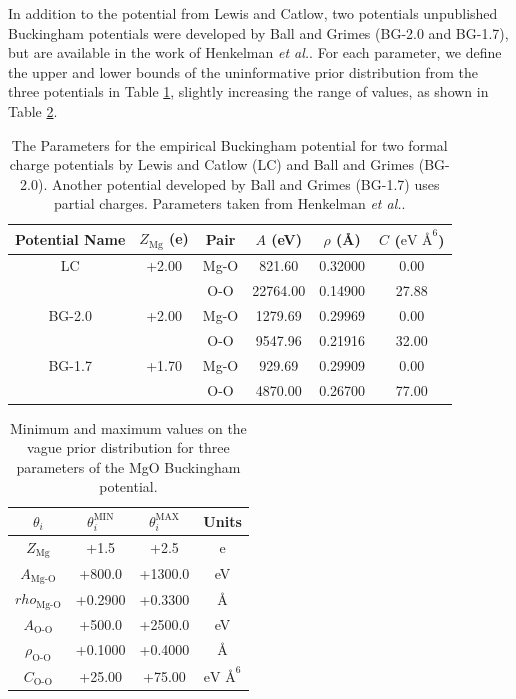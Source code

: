 In addition to the potential from Lewis and Catlow, two potentials unpublished Buckingham potentials were developed by Ball and Grimes (BG-2.0 and BG-1.7), but are available in the work of Henkelman \emph{et al.}\cite{henkelman2005_buckingham_MgO}.  For each parameter, we define the upper and lower bounds of the uninformative prior distribution from the three potentials in Table \ref{tlb:MgO_prior_potentials}, slightly increasing the range of values, as shown in Table \ref{tbl:MgO_inital_distribution}.

\begin{table}[ht]
	\caption{The Parameters for the empirical Buckingham potential for two formal charge potentials by Lewis and Catlow (LC)\cite{lewis1985_buckingham} and Ball and Grimes (BG-2.0). Another potential developed by Ball and Grimes (BG-1.7) uses partial charges. Parameters taken from Henkelman \emph{et al.}\cite{henkelman2005_buckingham_MgO}.}
	\label{tlb:MgO_prior_potentials}
	\centering
	\begin{tabular}{cccccc}
		\hline
		{Potential Name} & {$Z_{\text{Mg}}$ (e)} & Pair	 & $A$ (eV) & $\rho$ (\AA)	& $C$ ($\text{eV \AA}^6$) \\
		\hline
		LC	&    +2.00   &  Mg-O   &	 821.60  &   0.32000  &  0.00 \\
			  &            &   O-O	 & 22764.00	 &   0.14900  & 27.88 \\
		BG-2.0 & +2.00   &	Mg-O	 &  1279.69  &   0.29969  &  0.00 \\
		       &         & 	 O-O	 &  9547.96	 &   0.21916	& 32.00 \\
		BG-1.7 &  +1.70  &  Mg-O   &   929.69  &   0.29909  &	 0.00 \\
           &         &   O-O   &  4870.00	 &   0.26700  &	77.00 \\
		\hline
	\end{tabular}
\end{table}

\begin{table}[ht]
	\caption{Minimum and maximum values on the vague prior distribution for three parameters of the MgO Buckingham potential.}
	\label{tbl:MgO_inital_distribution}
	\centering
	\begin{tabular}{cccc}
    \hline
		$\theta_i$ & $\theta_i^{\text{MIN}}$ & $\theta_i^{\text{MAX}}$ & Units \\
		\hline
		$Z_{\text{Mg}}$ & +1.5 & +2.5 & e \\
		$A_{\text{Mg-O}}$ & +800.0 & +1300.0 & eV \\
		$rho_{\text{Mg-O}}$ & +0.2900 & +0.3300 & \AA \\
		$A_{\text{O-O}}$ & +500.0 & +2500.0 & eV \\
		$\rho_{\text{O-O}}$ & +0.1000 & +0.4000 & \AA \\
		$C_{\text{O-O}}$ & +25.00 & +75.00 & $\text{eV \AA}^6$ \\
	  \hline
	\end{tabular}
\end{table}

